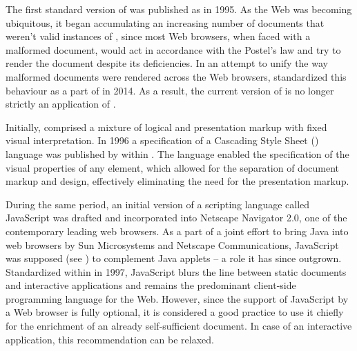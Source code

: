 \documentclass{book}
\begin{document}
        The first standard version of  was published as
        \cite{rfc1866} in 1995. As the Web was becoming ubiquitous, it began
        accumulating an increasing number of documents that weren't valid
        instances of , since most Web browsers, when faced with a
        malformed document, would act in accordance with the Postel's law and
        try to render the document despite its deficiencies. In an attempt to
        unify the way malformed  documents were rendered across
        the Web browsers,  standardized this behaviour as a part of
        \cite{berjon14} in 2014. As a result, the current version of
         is no longer strictly an application of .


        Initially,  comprised a mixture of logical and
        presentation markup with fixed visual interpretation. In 1996 a
        specification of a Cascading Style Sheet () language was
        published by  within \cite{lie96}. The language enabled
        the specification of the visual properties of any element, which allowed
        for the separation of document markup and design, effectively
        eliminating the need for the presentation markup.


        During the same period, an initial version of a scripting language
        called JavaScript was drafted and incorporated into Netscape Navigator
        2.0, one of the contemporary leading web browsers. As a part of a
        joint effort to bring Java into web browsers by Sun Microsystems and
        Netscape Communications, JavaScript was supposed (see
        \cite{js-announcement}) to complement Java applets -- a role it has
        since outgrown. Standardized within \cite{ecma1} in 1997, JavaScript
        blurs the line between static documents and interactive applications and
        remains the predominant client-side programming language for the Web.
        However, since the support of JavaScript by a Web browser is fully
        optional, it is considered a good practice to use it chiefly for the
        enrichment of an already self-sufficient  document. In
        case of an interactive application, this recommendation can be relaxed.
\end{document}
